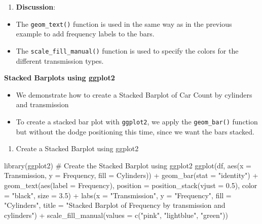 \documentclass[
  letterpaper,
  DIV=11,
  numbers=noendperiod]{scrreport}
\newenvironment{Shaded}{\begin{snugshade}}{\end{snugshade}}
\newcommand{\AttributeTok}[1]{\textcolor[rgb]{0.40,0.45,0.13}{#1}}
\newcommand{\CommentTok}[1]{\textcolor[rgb]{0.37,0.37,0.37}{#1}}
\newcommand{\FloatTok}[1]{\textcolor[rgb]{0.68,0.00,0.00}{#1}}
\newcommand{\FunctionTok}[1]{\textcolor[rgb]{0.28,0.35,0.67}{#1}}
\newcommand{\NormalTok}[1]{\textcolor[rgb]{0.00,0.23,0.31}{#1}}
\newcommand{\SpecialCharTok}[1]{\textcolor[rgb]{0.37,0.37,0.37}{#1}}
\newcommand{\StringTok}[1]{\textcolor[rgb]{0.13,0.47,0.30}{#1}}
\providecommand{\tightlist}{%
  \setlength{\itemsep}{0pt}\setlength{\parskip}{0pt}}\usepackage{longtable,booktabs,array}
\begin{document}
\begin{enumerate}
\def\labelenumi{\arabic{enumi}.}
\setcounter{enumi}{5}
\tightlist
\item
  \textbf{Discussion}:
\end{enumerate}

\begin{itemize}
\item
  The \texttt{geom\_text()} function is used in the same way as in the
  previous example to add frequency labels to the bars.
\item
  The \texttt{scale\_fill\_manual()} function is used to specify the
  colors for the different transmission types.
\end{itemize}

\textbf{Stacked Barplots using ggplot2}

\begin{itemize}
\item
  We demonstrate how to create a Stacked Barplot of Car Count by
  cylinders and transmission
\item
  To create a stacked bar plot with \texttt{ggplot2}, we apply the
  \texttt{geom\_bar()} function but without the dodge positioning this
  time, since we want the bars stacked.
\end{itemize}

\begin{enumerate}
\def\labelenumi{\arabic{enumi}.}
\setcounter{enumi}{6}
\tightlist
\item
  Create a Stacked Barplot using ggplot2
\end{enumerate}

\begin{Shaded}
\begin{Highlighting}[]
\FunctionTok{library}\NormalTok{(ggplot2)}
\CommentTok{\# Create the Stacked Barplot using ggplot2}
\FunctionTok{ggplot}\NormalTok{(df, }\FunctionTok{aes}\NormalTok{(}\AttributeTok{x =}\NormalTok{ Transmission, }\AttributeTok{y =}\NormalTok{ Frequency, }\AttributeTok{fill =}\NormalTok{ Cylinders)) }\SpecialCharTok{+} 
  \FunctionTok{geom\_bar}\NormalTok{(}\AttributeTok{stat =} \StringTok{"identity"}\NormalTok{) }\SpecialCharTok{+}
  \FunctionTok{geom\_text}\NormalTok{(}\FunctionTok{aes}\NormalTok{(}\AttributeTok{label =}\NormalTok{ Frequency), }
            \AttributeTok{position =} \FunctionTok{position\_stack}\NormalTok{(}\AttributeTok{vjust =} \FloatTok{0.5}\NormalTok{), }
            \AttributeTok{color =} \StringTok{"black"}\NormalTok{, }
            \AttributeTok{size =} \FloatTok{3.5}\NormalTok{) }\SpecialCharTok{+}
  \FunctionTok{labs}\NormalTok{(}\AttributeTok{x =} \StringTok{"Transmission"}\NormalTok{, }\AttributeTok{y =} \StringTok{"Frequency"}\NormalTok{, }
       \AttributeTok{fill =} \StringTok{"Cylinders"}\NormalTok{,}
       \AttributeTok{title =} \StringTok{"Stacked Barplot of Frequency by transmission and cylinders"}\NormalTok{) }\SpecialCharTok{+}
  \FunctionTok{scale\_fill\_manual}\NormalTok{(}\AttributeTok{values =} \FunctionTok{c}\NormalTok{(}\StringTok{"pink"}\NormalTok{, }\StringTok{"lightblue"}\NormalTok{, }\StringTok{"green"}\NormalTok{))}
\end{Highlighting}
\end{Shaded}
\end{document}
